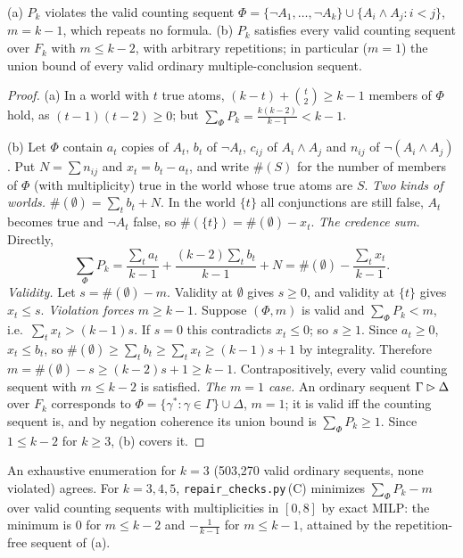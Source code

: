 \begin{theorem}\label{thm:existence:threshold}
\textup{(a)} $P_k$ violates the valid counting sequent $\Phi=\{\neg A_1,\dots,\neg A_k\}\cup\{A_i\wedge A_j:i<j\}$, $m=k-1$, which repeats no formula. \textup{(b)} $P_k$ satisfies every valid counting sequent over $F_k$ with $m\le k-2$, with arbitrary repetitions; in particular ($m=1$) the union bound of every valid ordinary multiple-conclusion sequent.
\end{theorem}

\begin{proof}
(a) In a world with $t$ true atoms, $(k-t)+\binom t2\ge k-1$ members of $\Phi$ hold, as $(t-1)(t-2)\ge0$; but $\sum_\Phi P_k=\frac{k(k-2)}{k-1}<k-1$.

(b) Let $\Phi$ contain $a_t$ copies of $A_t$, $b_t$ of $\neg A_t$, $c_{ij}$ of $A_i\wedge A_j$ and $n_{ij}$ of $\neg(A_i\wedge A_j)$. Put $N=\sum n_{ij}$ and $x_t=b_t-a_t$, and write $\#(S)$ for the number of members of $\Phi$ (with multiplicity) true in the world whose true atoms are $S$.
\emph{Two kinds of worlds.} $\#(\emptyset)=\sum_tb_t+N$. In the world $\{t\}$ all conjunctions are still false, $A_t$ becomes true and $\neg A_t$ false, so $\#(\{t\})=\#(\emptyset)-x_t$.
\emph{The credence sum.} Directly,
\[
\textstyle\sum_\Phi P_k=\frac{\sum_ta_t}{k-1}+\frac{(k-2)\sum_tb_t}{k-1}+N=\#(\emptyset)-\frac{\sum_tx_t}{k-1}.
\]
\emph{Validity.} Let $s=\#(\emptyset)-m$. Validity at $\emptyset$ gives $s\ge0$, and validity at $\{t\}$ gives $x_t\le s$.
\emph{Violation forces $m\ge k-1$.} Suppose $(\Phi,m)$ is valid and $\sum_\Phi P_k<m$, i.e.\ $\sum_tx_t>(k-1)s$. If $s=0$ this contradicts $x_t\le0$; so $s\ge1$. Since $a_t\ge0$, $x_t\le b_t$, so $\#(\emptyset)\ge\sum_tb_t\ge\sum_tx_t\ge(k-1)s+1$ by integrality. Therefore $m=\#(\emptyset)-s\ge(k-2)s+1\ge k-1$.
Contrapositively, every valid counting sequent with $m\le k-2$ is satisfied.
\emph{The $m=1$ case.} An ordinary sequent $\Gamma\rhd\Delta$ over $F_k$ corresponds to $\Phi=\{\gamma^*:\gamma\in\Gamma\}\cup\Delta$, $m=1$; it is valid iff the counting sequent is, and by negation coherence its union bound is $\sum_\Phi P_k\ge1$. Since $1\le k-2$ for $k\ge3$, (b) covers it.
\end{proof}

An exhaustive enumeration for $k=3$ (503{,}270 valid ordinary sequents, none violated) agrees. For $k=3,4,5$, \texttt{repair\_checks.py}\,(C) minimizes $\sum_\Phi P_k-m$ over valid counting sequents with multiplicities in $[0,8]$ by exact MILP: the minimum is $0$ for $m\le k-2$ and $-\frac1{k-1}$ for $m\le k-1$, attained by the repetition-free sequent of (a).

